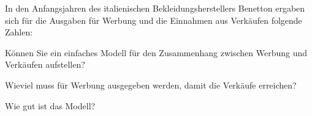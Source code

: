 In den Anfangsjahren des italienischen Bekleidungsherstellers Benetton
ergaben sich für die Ausgaben für Werbung und die Einnahmen aus
Verkäufen folgende Zahlen:
\begin{center}
\end{center}
\begin{teilaufgaben}
\item
Können Sie ein einfaches Modell für den Zusammenhang zwischen Werbung
und Verkäufen aufstellen?
\item
Wieviel muss für Werbung ausgegeben werden, damit die Verkäufe
erreichen?
\item 
Wie gut ist das Modell?
\end{teilaufgaben}


